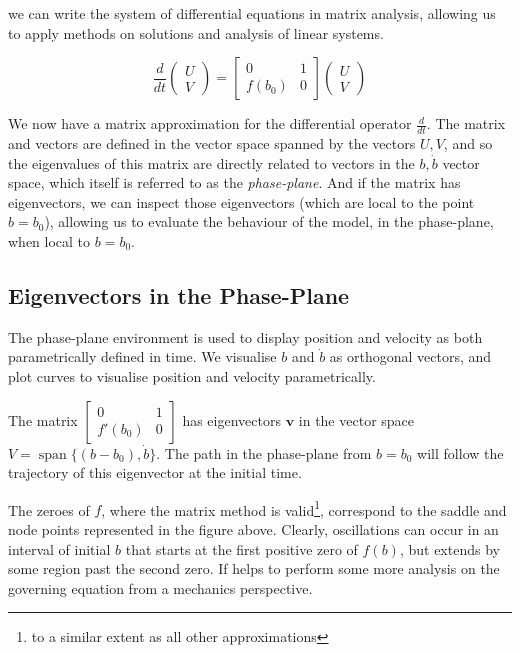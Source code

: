 \documentclass{article}
\begin{document}
we can write the system of differential equations in matrix analysis,
allowing us to apply methods on solutions and analysis of linear systems.

\begin{equation}
    \frac{d}{dt}\begin{pmatrix}
        U \\
        V
    \end{pmatrix} = \begin{bmatrix}
        0 & 1 \\
        f(b_0) & 0
    \end{bmatrix} \begin{pmatrix}
        U \\
        V
    \end{pmatrix}
\end{equation}

We now have a matrix approximation for the differential operator $\frac{d}{dt}$.
The matrix and vectors are defined in the vector space spanned by the vectors $U,V$,
and so the eigenvalues of this matrix are directly related to vectors in the $b,\dot{b}$ vector space,
which itself is referred to as the \textit{phase-plane}.
And if the matrix has eigenvectors, we can inspect those eigenvectors (which are local to the point $b=b_0$),
allowing us to evaluate the behaviour of the model, in the phase-plane,
when local to $b=b_0$.

\subsection{Eigenvectors in the Phase-Plane}

The phase-plane environment is used to display position and velocity as both parametrically defined in time.
We visualise $b$ and $\dot{b}$ as orthogonal vectors, and plot curves to visualise position and velocity parametrically.


The matrix $\begin{bmatrix}
	0 & 1 \\
	f'(b_0) & 0
\end{bmatrix}$ has eigenvectors $\mathbf{v}$ in the vector space $V = \operatorname{span}\{(b-b_0),\dot{b}\}$.
The path in the phase-plane from $b=b_0$ will follow the trajectory of this eigenvector at the initial time.


The zeroes of $f$, where the matrix method is valid\footnote{to a similar extent as all other approximations},
correspond to the saddle and node points represented in the figure above. %
Clearly, oscillations can occur in an interval of initial $b$ that starts at the first positive zero of $f(b)$,
but extends by some region past the second zero.
If helps to perform some more analysis on the governing equation from a mechanics perspective.
\end{document}
